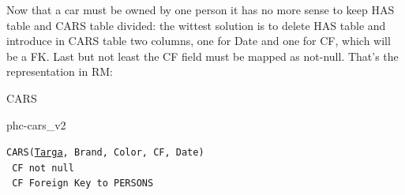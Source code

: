 \documentclass[class=book, crop=false, oneside]{standalone}
\begin{document}
Now that a car must be owned by one person it has no more sense to keep HAS table and CARS table divided: the wittest solution is to delete HAS table and introduce in CARS table two columns, one for Date and one for CF, which will be a FK. Last but not least the CF field must be mapped as not-null.
That's the representation in RM:
\vskip 20pt
\begin{minipage}{.8\textwidth}
	CARS
	\begin{table}[H]
		{phc-cars_v2}
	\end{table}
	\texttt{CARS(\underline{Targa}, Brand, Color, CF, Date)}\\
	\texttt{	CF not null}\\
	\texttt{	CF Foreign Key to PERSONS}
\end{minipage}


%
%
%
\end{document}
